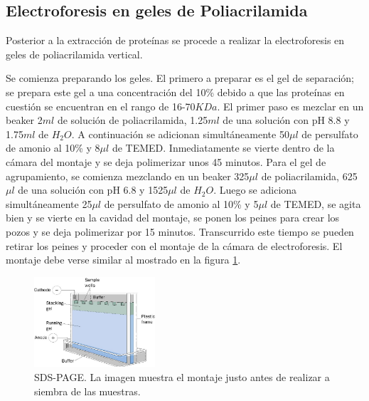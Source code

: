 \documentclass[%
 reprint,
 amsmath,amssymb,
 aps,
showkeys,
letter,
12pts
]{revtex4-1}
\begin{document}
			
	\subsection{\label{sec:ElectroMet}Electroforesis en geles de Poliacrilamida}\cite{guia}
		Posterior a la extracción de proteínas se procede a realizar la electroforesis en geles de poliacrilamida vertical. 
		
		Se comienza preparando los geles. El primero a preparar es el gel de separación; se prepara este gel a una concentración del 10\% debido a que las proteínas en cuestión se encuentran en el rango de 16-70$KDa$. El primer paso es mezclar en un beaker 2$ml$ de solución de poliacrilamida, 1.25$ml$ de una solución con pH 8.8 y 1.75$ml$ de $H_2O$. A continuación se adicionan simultáneamente 50$\mu l$ de persulfato de amonio al 10\% y 8$\mu l$ de TEMED. Inmediatamente se vierte dentro de la cámara del montaje y se deja polimerizar unos 45 minutos. Para el gel de agrupamiento, se comienza mezclando en un beaker 325$\mu l$ de poliacrilamida, 625$\mu l$ de una solución con pH 6.8 y 1525$\mu l$ de $H_2O$. Luego se adiciona simultáneamente 25$\mu l$ de persulfato de amonio al 10\% y 5$\mu l$ de TEMED, se agita bien y se vierte en la cavidad del montaje, se ponen los peines para crear los pozos y se deja polimerizar por 15 minutos. Transcurrido este tiempo se pueden retirar los peines y proceder con el montaje de la cámara de electroforesis. El montaje debe verse similar al mostrado en la figura \ref{Imagen: SDS-PAGE}.
		
		\begin{figure}[h]
		\includegraphics[width=0.4\textwidth]{SDS-PAGE.jpg}
		\caption{SDS-PAGE. La imagen muestra el montaje justo antes de realizar a siembra de las muestras.}
		\label{Imagen: SDS-PAGE}
		\end{figure} 
\end{document}
